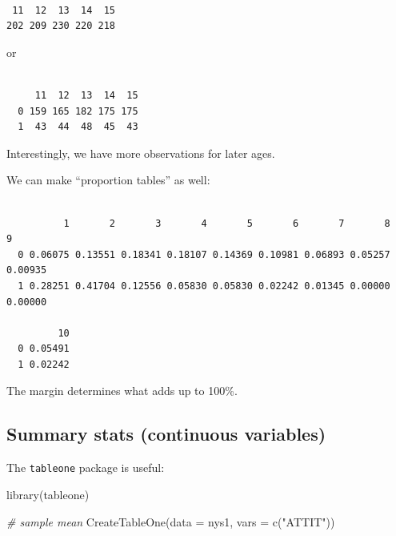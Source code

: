 \documentclass[
  letterpaper,
  DIV=11,
  numbers=noendperiod]{scrreprt}
\newenvironment{Shaded}{}{}
\newcommand{\AttributeTok}[1]{\textcolor[rgb]{0.49,0.56,0.16}{#1}}
\newcommand{\CommentTok}[1]{\textcolor[rgb]{0.38,0.63,0.69}{\textit{#1}}}
\newcommand{\DecValTok}[1]{\textcolor[rgb]{0.25,0.63,0.44}{#1}}
\newcommand{\FunctionTok}[1]{\textcolor[rgb]{0.02,0.16,0.49}{#1}}
\newcommand{\NormalTok}[1]{#1}
\newcommand{\SpecialCharTok}[1]{\textcolor[rgb]{0.25,0.44,0.63}{#1}}
\newcommand{\StringTok}[1]{\textcolor[rgb]{0.25,0.44,0.63}{#1}}
\begin{document}
\begin{verbatim}

 11  12  13  14  15 
202 209 230 220 218 
\end{verbatim}

or

\begin{Shaded}
\end{Shaded}

\begin{verbatim}
   
     11  12  13  14  15
  0 159 165 182 175 175
  1  43  44  48  45  43
\end{verbatim}

Interestingly, we have more observations for later ages.

We can make ``proportion tables'' as well:

\begin{Shaded}
\end{Shaded}

\begin{verbatim}
   
          1       2       3       4       5       6       7       8       9
  0 0.06075 0.13551 0.18341 0.18107 0.14369 0.10981 0.06893 0.05257 0.00935
  1 0.28251 0.41704 0.12556 0.05830 0.05830 0.02242 0.01345 0.00000 0.00000
   
         10
  0 0.05491
  1 0.02242
\end{verbatim}

The margin determines what adds up to 100\%.

\subsection{Summary stats (continuous
variables)}\label{summary-stats-continuous-variables}

The \texttt{tableone} package is useful:

\begin{Shaded}
\begin{Highlighting}[]
  \FunctionTok{library}\NormalTok{(tableone)}
  
\CommentTok{\# sample mean  }
  \FunctionTok{CreateTableOne}\NormalTok{(}\AttributeTok{data =}\NormalTok{ nys1,}
                 \AttributeTok{vars =} \FunctionTok{c}\NormalTok{(}\StringTok{"ATTIT"}\NormalTok{))}
\end{Highlighting}
\end{Shaded}
\end{document}

